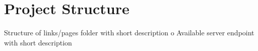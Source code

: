 \section{Project Structure}
Structure of links/pages folder with short description
o Available server endpoint with short description